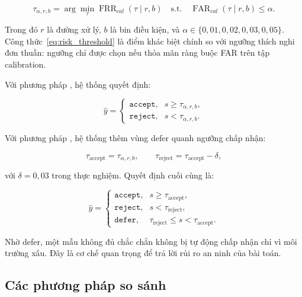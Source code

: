 \begin{equation}
    \tau_{\alpha,r,b}
    =
    \arg\min_{\tau}
    \operatorname{FRR}_{cal}(\tau \mid r,b)
    \quad
    \text{s.t.}
    \quad
    \operatorname{FAR}_{cal}(\tau \mid r,b) \leq \alpha.
    \label{eq:risk_threshold}
\end{equation}

Trong đó $r$ là đường xử lý, $b$ là bin điều kiện, và $\alpha \in \{0{,}01, 0{,}02, 0{,}03, 0{,}05\}$. Công thức~\ref{eq:risk_threshold} là điểm khác biệt chính so với ngưỡng thích nghi đơn thuần: ngưỡng chỉ được chọn nếu thỏa mãn ràng buộc FAR trên tập calibration.

Với phương pháp , hệ thống quyết định:

\begin{equation}
    \hat{y} =
    \begin{cases}
        \texttt{accept}, & s \geq \tau_{\alpha,r,b},\\
        \texttt{reject}, & s < \tau_{\alpha,r,b}.
    \end{cases}
    \label{eq:m5_decision}
\end{equation}

Với phương pháp , hệ thống thêm vùng defer quanh ngưỡng chấp nhận:

\begin{equation}
    \tau_{\text{accept}} = \tau_{\alpha,r,b},
    \qquad
    \tau_{\text{reject}} = \tau_{\text{accept}} - \delta,
    \label{eq:defer_thresholds}
\end{equation}

\noindent với $\delta=0{,}03$ trong thực nghiệm. Quyết định cuối cùng là:

\begin{equation}
    \hat{y} =
    \begin{cases}
        \texttt{accept}, & s \geq \tau_{\text{accept}},\\
        \texttt{reject}, & s < \tau_{\text{reject}},\\
        \texttt{defer}, & \tau_{\text{reject}} \leq s < \tau_{\text{accept}}.
    \end{cases}
    \label{eq:m6_decision}
\end{equation}

Nhờ defer, một mẫu không đủ chắc chắn không bị tự động chấp nhận chỉ vì môi trường xấu. Đây là cơ chế quan trọng để trả lời rủi ro an ninh của bài toán.

\subsection{Các phương pháp so sánh}

